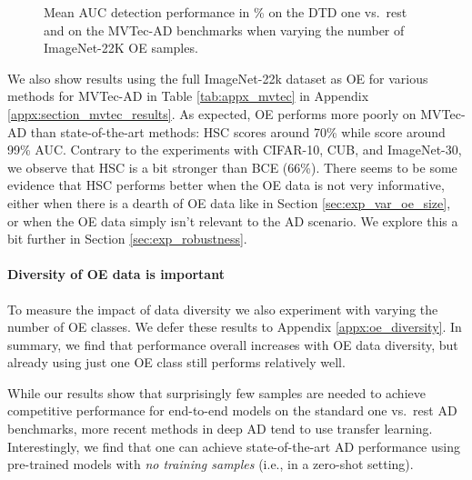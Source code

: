\documentclass[10pt]{article} \usepackage[accepted]{stylefiles/tmlr}
\begin{document}
\begin{figure}[hbt]  \begin{center} 
      \caption{Mean AUC detection performance in \% on the DTD one vs.~rest and on the MVTec-AD benchmarks when varying the number of ImageNet-22K OE samples.}
      \label{fig:var_oe_size_mvtec}
  \end{center}
\end{figure}


We also show results using the full ImageNet-22k dataset as OE for various methods for MVTec-AD in Table \ref{tab:appx_mvtec} in Appendix \ref{appx:section_mvtec_results}. 
As expected, OE performs more poorly on MVTec-AD than state-of-the-art methods: HSC scores around 70\% while \citet{roth2022towards} score around 99\% AUC. 
Contrary to the experiments with CIFAR-10, CUB, and ImageNet-30, we observe that HSC is a bit stronger than BCE (66\%). There seems to be some evidence that HSC performs better when the OE data is not very informative, either when there is a dearth of OE data like in Section \ref{sec:exp_var_oe_size}, or when the OE data simply isn't relevant to the AD scenario. We explore this a bit further in Section \ref{sec:exp_robustness}. 


\paragraph{Diversity of OE data is important}
To measure the impact of data diversity we also experiment with varying the number of OE classes.
We defer these results to Appendix \ref{appx:oe_diversity}.
In summary, we find that performance overall increases with OE data diversity, but already using just one OE class still performs relatively well. 


While our results show that surprisingly few samples are needed to achieve competitive performance for end-to-end models on the standard one vs.~rest AD benchmarks, more recent methods in deep AD tend to use transfer learning. 
Interestingly, we find that one can achieve state-of-the-art AD performance using pre-trained models with \emph{no training samples} (i.e., in a zero-shot setting).
\end{document}
